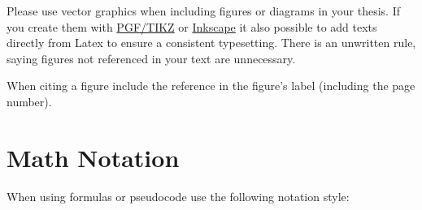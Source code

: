 Please use vector graphics when including figures or diagrams in your thesis.
If you create them with \href{https://en.wikipedia.org/wiki/PGF/TikZ}{PGF/TIKZ} or \href{https://inkscape.org/}{Inkscape} it also possible to add texts directly from Latex to ensure a consistent typesetting.
There is an unwritten rule, saying figures not referenced in your text are unnecessary.

When citing a figure include the reference in the figure's label (including the page number).

\section{Math Notation}

When using formulas or pseudocode use the following notation style:

